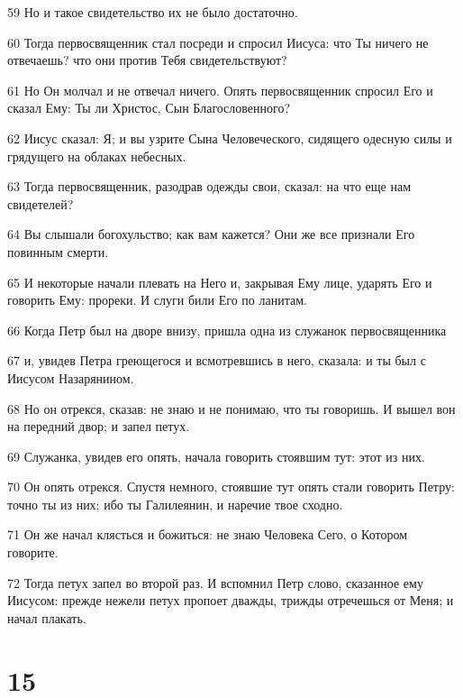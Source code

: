 \par 59 Но и такое свидетельство их не было достаточно.
\par 60 Тогда первосвященник стал посреди и спросил Иисуса: что Ты ничего не отвечаешь? что они против Тебя свидетельствуют?
\par 61 Но Он молчал и не отвечал ничего. Опять первосвященник спросил Его и сказал Ему: Ты ли Христос, Сын Благословенного?
\par 62 Иисус сказал: Я; и вы узрите Сына Человеческого, сидящего одесную силы и грядущего на облаках небесных.
\par 63 Тогда первосвященник, разодрав одежды свои, сказал: на что еще нам свидетелей?
\par 64 Вы слышали богохульство; как вам кажется? Они же все признали Его повинным смерти.
\par 65 И некоторые начали плевать на Него и, закрывая Ему лице, ударять Его и говорить Ему: прореки. И слуги били Его по ланитам.
\par 66 Когда Петр был на дворе внизу, пришла одна из служанок первосвященника
\par 67 и, увидев Петра греющегося и всмотревшись в него, сказала: и ты был с Иисусом Назарянином.
\par 68 Но он отрекся, сказав: не знаю и не понимаю, что ты говоришь. И вышел вон на передний двор; и запел петух.
\par 69 Служанка, увидев его опять, начала говорить стоявшим тут: этот из них.
\par 70 Он опять отрекся. Спустя немного, стоявшие тут опять стали говорить Петру: точно ты из них; ибо ты Галилеянин, и наречие твое сходно.
\par 71 Он же начал клясться и божиться: не знаю Человека Сего, о Котором говорите.
\par 72 Тогда петух запел во второй раз. И вспомнил Петр слово, сказанное ему Иисусом: прежде нежели петух пропоет дважды, трижды отречешься от Меня; и начал плакать.

\chapter{15}

